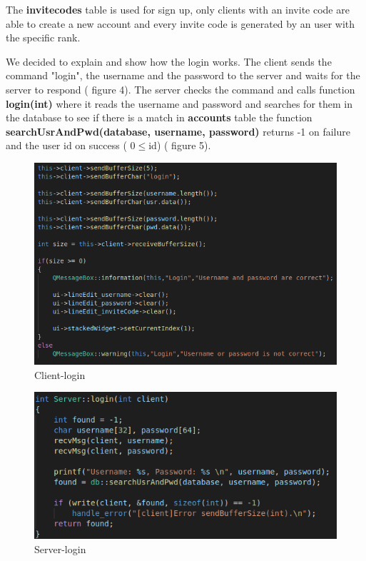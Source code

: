 \documentclass[runningheads]{llncs}
\begin{document}
\par The \textbf{invitecodes} table is used for sign up, only clients with an invite code are able to create a new account and every invite code is generated by an user with the specific rank.

\newpage 
\par We decided to explain and show how the login works. The client sends the command "login", the username and the password to the server and waits for the server to respond ( figure 4). The server checks the command and calls function \textbf{login(int)} where it reads the username and password and searches for them in the database to see if there is a match in \textbf{accounts} table the function \textbf{searchUsrAndPwd(database, username, password)} returns -1 on failure and the user id on success ( 0$\leq$id) ( figure 5).

\begin{figure}[H]
\includegraphics[]{images/client-login.png}
\caption{Client-login}
\end{figure}

\newpage 
\begin{figure}[H]
\begin{center}
\includegraphics[]{images/server-login.png}
\caption{Server-login}
\end{center}
\end{figure}
\end{document}
